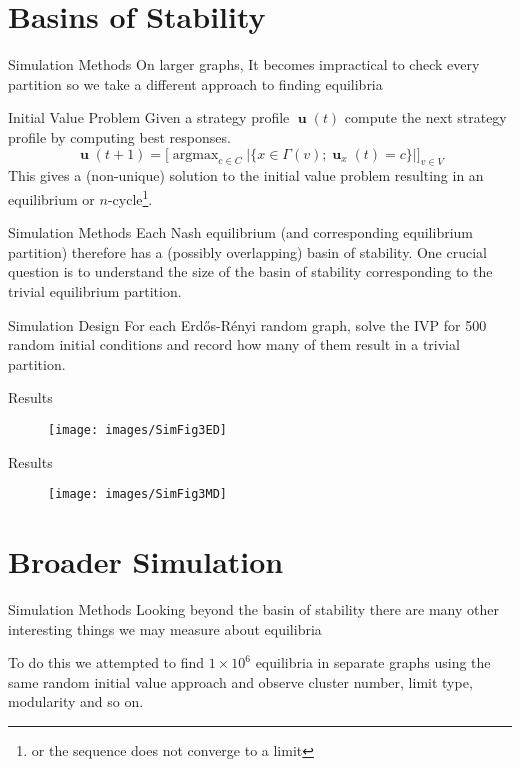 \documentclass{beamer}
\DeclareMathOperator*{\argmax}{\text{argmax}}
\DeclareMathOperator{\uu}{\mathbf{u}}
\begin{document}
\section{Basins of Stability}
\begin{frame}{Simulation Methods}
	On larger graphs, It becomes impractical to check every partition so we take a different approach to finding equilibria
	\begin{block}{Initial Value Problem}
		Given a strategy profile $\uu(t)$ compute the next strategy profile by computing best responses.
		\begin{equation*}
			\uu(t+1)=\big[\argmax_{c\in C}|\{x\in\Gamma(v); \uu_x(t)=c\} |]_{v\in V}
		\end{equation*}
		This gives a (non-unique) solution to the initial value problem resulting in an equilibrium or $n$-cycle\footnote{or the sequence does not converge to a limit}.
	\end{block}
\end{frame}
\begin{frame}{Simulation Methods}
	Each Nash equilibrium (and corresponding equilibrium partition) therefore has a (possibly overlapping) basin of stability. One crucial question is to understand the size of the basin of stability corresponding to the trivial equilibrium partition. 
	\begin{block}{Simulation Design}
		For each Erd\H{o}s-R\'enyi random graph, solve the IVP for 500 random initial conditions and record how many of them result in a trivial partition. 
	\end{block}
\end{frame}
\begin{frame}{Results}
	\begin{figure}
		\centering
		\texttt{[image: images/SimFig3ED]}
	\end{figure}
\end{frame}
\begin{frame}{Results}
	\begin{figure}
		\centering
		\texttt{[image: images/SimFig3MD]}
	\end{figure}
	\end{frame}
\section{Broader Simulation}
\begin{frame}{Simulation Methods}
	Looking beyond the basin of stability there are many other interesting things we may measure about equilibria
	
	To do this we attempted to find $1\times 10^6$ equilibria in separate graphs using the same random initial value approach and observe cluster number, limit type, modularity and so on. 
\end{frame}
\end{document}
